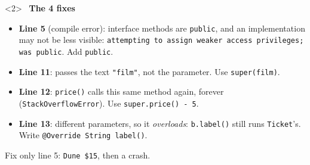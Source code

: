 \documentclass[aspectratio=169]{beamer}
\newcommand{\code}[1]{\texttt{#1}}
\newcommand{\goodlabel}[1]{\textcolor{goodgreen}{\ding{51}~\textbf{#1}}}
\begin{document}
\begin{frame}
\begin{columns}[T,onlytextwidth]
    \begin{onlyenv}<2>
    \goodlabel{The 4 fixes}
    \begin{itemize}[itemsep=0.2em, leftmargin=1em]
      \footnotesize
      \item \textbf{Line 5} (compile error): interface methods are \code{public},
            and an implementation may not be less visible:
            \code{attempting to assign weaker access privileges; was public}. Add
            \code{public}.
      \item \textbf{Line 11}: passes the text \code{"film"}, not the parameter. Use
            \code{super(film)}.
      \item \textbf{Line 12}: \code{price()} calls this same method again, forever
            (\code{StackOverflowError}). Use \code{super.price() - 5}.
      \item \textbf{Line 13}: different parameters, so it \emph{overloads}:
            \code{b.label()} still runs \code{Ticket}'s. Write
            \code{@Override String label()}.
    \end{itemize}
    {\footnotesize Fix only line 5: \code{Dune \$15}, then a crash.}
    \end{onlyenv}
  \end{columns}
\end{frame}
\end{document}
